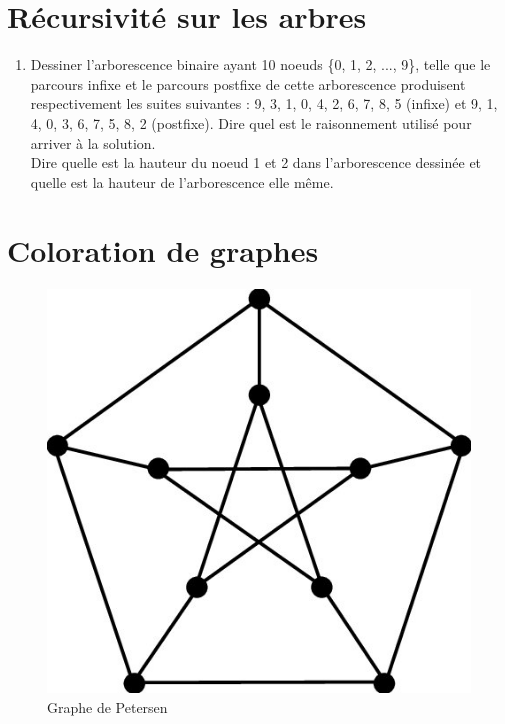 \documentclass{article}[12pt]
\begin{document}
\section*{Récursivité sur les arbres}
\begin{enumerate}
\item Dessiner l'arborescence binaire ayant 10 noeuds \{0, 1, 2, ..., 9\}, telle que le parcours infixe et le parcours postfixe de cette arborescence produisent respectivement les suites suivantes : 9, 3, 1, 0, 4, 2, 6, 7, 8, 5 (infixe) et 9, 1, 4, 0, 3, 6, 7, 5, 8, 2 (postfixe). Dire quel est le raisonnement utilisé pour arriver à la solution.\\ Dire quelle est la hauteur du noeud 1 et 2 dans l'arborescence dessinée et quelle est la hauteur de l'arborescence elle même. \\

\end{enumerate}

\section*{Coloration de graphes}

\begin{figure}[h!]
    \centering
    \includegraphics[scale=0.3]{Petersen.png}
    \caption{Graphe de Petersen}
    \label{fig:petersen}
\end{figure}
\end{document}
